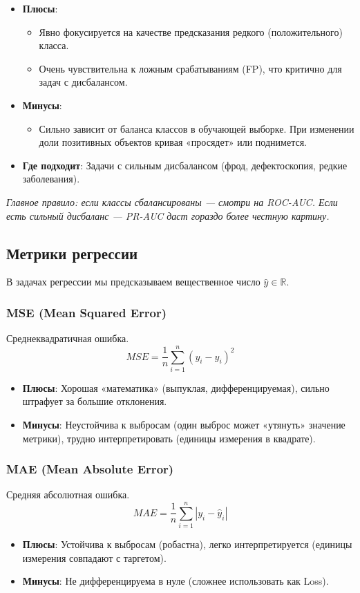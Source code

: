 \documentclass[12pt]{article}
\newcommand{\commentary}[1]{{\small\itshape\color{commentgray} #1}}
\begin{document}
\begin{itemize}
    \item \textbf{Плюсы}: 
    \begin{itemize}
        \item Явно фокусируется на качестве предсказания редкого (положительного) класса.
        \item Очень чувствительна к ложным срабатываниям (FP), что критично для задач с дисбалансом.
    \end{itemize}
    \item \textbf{Минусы}: 
    \begin{itemize}
        \item Сильно зависит от баланса классов в обучающей выборке. При изменении доли позитивных объектов кривая «просядет» или поднимется.
    \end{itemize}
    \item \textbf{Где подходит}: Задачи с сильным дисбалансом (фрод, дефектоскопия, редкие заболевания).
\end{itemize}


\commentary{Главное правило: если классы сбалансированы — смотри на ROC-AUC. Если есть сильный дисбаланс — PR-AUC даст гораздо более честную картину.}


\subsection{Метрики регрессии}

В задачах регрессии мы предсказываем вещественное число $\widehat{y} \in \mathbb{R}$.

\subsubsection{MSE (Mean Squared Error)}
Среднеквадратичная ошибка.
\[ MSE = \frac{1}{n} \sum_{i=1}^n (y_i - \widehat{y}_i)^2 \]
\begin{itemize}
    \item \textbf{Плюсы}: Хорошая «математика» (выпуклая, дифференцируемая), сильно штрафует за большие отклонения.
    \item \textbf{Минусы}: Неустойчива к выбросам (один выброс может «утянуть» значение метрики), трудно интерпретировать (единицы измерения в квадрате).
\end{itemize}

\subsubsection{MAE (Mean Absolute Error)}
Средняя абсолютная ошибка.
\[ MAE = \frac{1}{n} \sum_{i=1}^n |y_i - \widehat{y}_i| \]
\begin{itemize}
    \item \textbf{Плюсы}: Устойчива к выбросам (робастна), легко интерпретируется (единицы измерения совпадают с таргетом).
    \item \textbf{Минусы}: Не дифференцируема в нуле (сложнее использовать как Loss).
\end{itemize}
\end{document}
